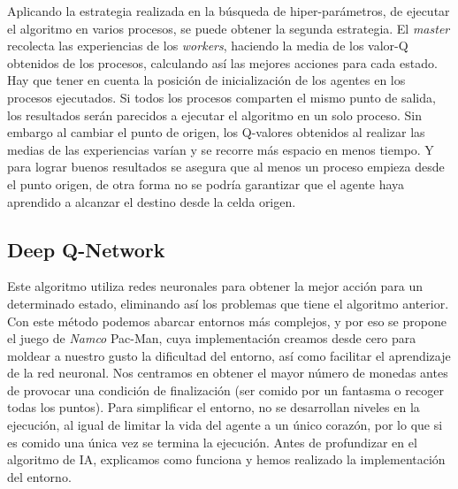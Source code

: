 		Aplicando la estrategia realizada en la búsqueda de hiper-parámetros, de ejecutar el algoritmo en varios procesos, se puede obtener la segunda estrategia. El \textit{master} recolecta las experiencias de los \textit{workers}, haciendo la media de los valor-Q obtenidos de los procesos, calculando así las mejores acciones para cada estado. Hay que tener en cuenta la posición de inicialización de los agentes en los procesos ejecutados. Si todos los procesos comparten el mismo punto de salida, los resultados serán parecidos a ejecutar el algoritmo en un solo proceso. Sin embargo al cambiar el punto de origen, los Q-valores obtenidos al realizar las medias de las experiencias varían y se recorre más espacio en menos tiempo. Y para lograr buenos resultados se asegura que al menos un proceso empieza desde el punto origen, de otra forma no se podría garantizar que el agente haya aprendido a alcanzar el destino desde la celda origen.			
			
			
	
	
	
	
	\subsection{Deep Q-Network}
	\label{cap:3_3_2}
		Este algoritmo utiliza redes neuronales para obtener la mejor acción para un determinado estado, eliminando así los problemas que tiene el algoritmo anterior. Con este método podemos abarcar entornos más complejos, y por eso se propone el juego de \textit{Namco} Pac-Man, cuya implementación  creamos desde cero para moldear a nuestro gusto la dificultad del entorno, así como facilitar el aprendizaje de la red neuronal. Nos centramos en obtener el mayor número de monedas antes de provocar una condición de finalización (ser comido por un fantasma o recoger todas los puntos). Para simplificar el entorno, no se desarrollan niveles en la ejecución, al igual de limitar la vida del agente a un único corazón, por lo que si es comido una única vez se termina la ejecución. Antes de profundizar en el algoritmo de IA, explicamos como funciona y hemos realizado la implementación del entorno.
	
